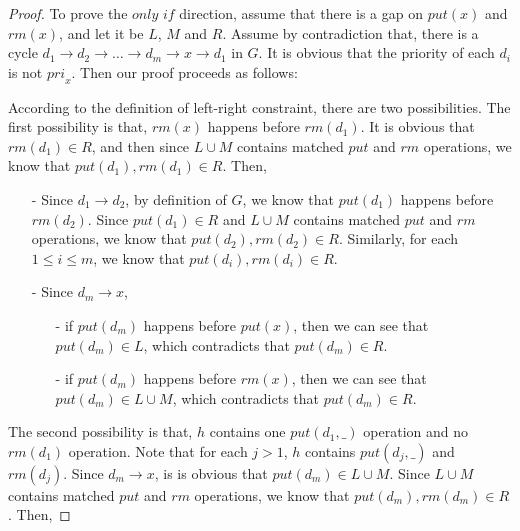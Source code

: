 \documentclass{llncs}
\begin{document}
\begin {proof}

To prove the $\textit{only if}$ direction, assume that there is a gap on $\textit{put}(x)$ and $\textit{rm}(x)$, and let it be $L$, $M$ and $R$. Assume by contradiction that, there is a cycle $d_1 \rightarrow d_2 \rightarrow \ldots \rightarrow d_m \rightarrow x \rightarrow d_1$ in $G$. It is obvious that the priority of each $d_i$ is not $\textit{pri}_x$. Then our proof proceeds as follows:

According to the definition of left-right constraint, there are two possibilities. The first possibility is that, $\textit{rm}(x)$ happens before $\textit{rm}(d_1)$. It is obvious that $\textit{rm}(d_1) \in R$, and then since $L \cup M$ contains matched $\textit{put}$ and $\textit{rm}$ operations, we know that $\textit{put}(d_1),\textit{rm}(d_1) \in R$. Then,

\begin{itemize}
\setlength{\itemsep}{0.5pt}
\item[-] Since $d_1 \rightarrow d_2$, by definition of $G$, we know that $\textit{put}(d_1)$ happens before $\textit{rm}(d_2)$. Since $\textit{put}(d_1) \in R$ and $L \cup M$ contains matched $\textit{put}$ and $\textit{rm}$ operations, we know that $\textit{put}(d_2),\textit{rm}(d_2) \in R$. Similarly, for each $1 \leq i \leq m$, we know that $\textit{put}(d_i),\textit{rm}(d_i) \in R$.

\item[-] Since $d_m \rightarrow x$,
    \begin{itemize}
    \setlength{\itemsep}{0.5pt}
    \item[-] if $\textit{put}(d_m)$ happens before $\textit{put}(x)$, then we can see that $\textit{put}(d_m) \in L$, which contradicts that $\textit{put}(d_m) \in R$.

    \item[-] if $\textit{put}(d_m)$ happens before $\textit{rm}(x)$, then we can see that $\textit{put}(d_m) \in L \cup M$, which contradicts that $\textit{put}(d_m) \in R$.
    \end{itemize}
\end{itemize}

The second possibility is that, $h$ contains one $\textit{put}(d_1,\_)$ operation and no $\textit{rm}(d_1)$ operation. Note that for each $j > 1$, $h$ contains $\textit{put}(d_j,\_)$ and $\textit{rm}(d_j)$. Since $d_m \rightarrow x$, is is obvious that $\textit{put}(d_m) \in L \cup M$. Since $L \cup M$ contains matched $\textit{put}$ and $\textit{rm}$ operations, we know that $\textit{put}(d_m),\textit{rm}(d_m) \in R$. Then,


\end{proof}
\end{document}
